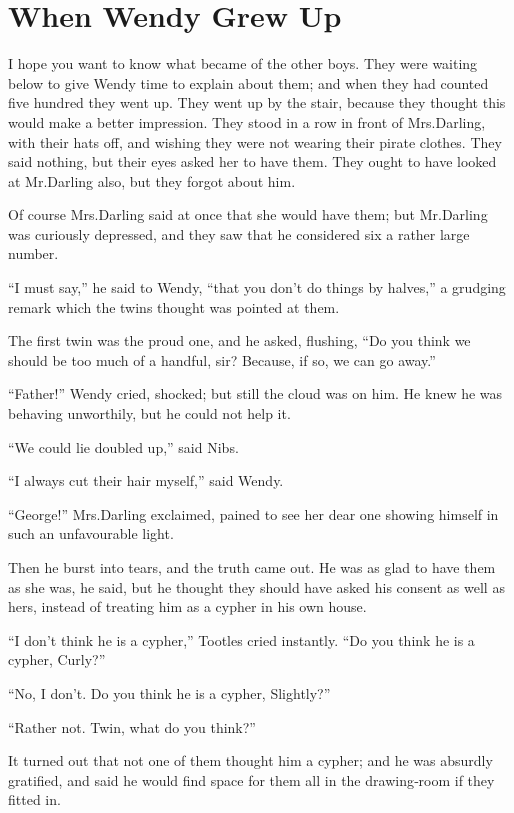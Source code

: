 
\chapter{When Wendy Grew Up}

I hope you want to know what became of the other boys.
They were waiting below to give Wendy time to explain about them;
and when they had counted five hundred they went up.
They went up by the stair,
because they thought this would make a better impression.
They stood in a row in front of Mrs.\@ Darling, with their hats off,
and wishing they were not wearing their pirate clothes.
They said nothing, but their eyes asked her to have them.
They ought to have looked at Mr.\@ Darling also, but they forgot about him.

Of course Mrs.\@ Darling said at once that she would have them;
but Mr.\@ Darling was curiously depressed,
and they saw that he considered six a rather large number.

“I must say,” he said to Wendy, “that you don’t do things by halves,”
a grudging remark which the twins thought was pointed at them.

The first twin was the proud one, and he asked, flushing,
“Do you think we should be too much of a handful, sir?
Because, if so, we can go away.”

“Father!\@” Wendy cried, shocked;
but still the cloud was on him.
He knew he was behaving unworthily, but he could not help it.

“We could lie doubled up,” said Nibs.

“I always cut their hair myself,” said Wendy.

“George!\@” Mrs.\@ Darling exclaimed,
pained to see her dear one showing himself in such an unfavourable light.

Then he burst into tears, and the truth came out.
He was as glad to have them as she was, he said,
but he thought they should have asked his consent as well as hers, instead of treating him as a cypher in his own house.

“I don’t think he is a cypher,” Tootles cried instantly.
“Do you think he is a cypher, Curly?”

“No, I don’t.
Do you think he is a cypher, Slightly?”

“Rather not.
Twin, what do you think?”

It turned out that not one of them thought him a cypher;
and he was absurdly gratified,
and said he would find space for them all in the drawing‐room if they fitted in.

